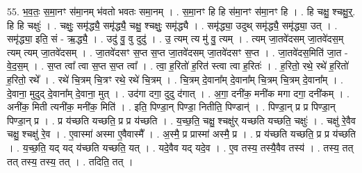 \documentclass[17pt]{extarticle}
\begin{document}
55. भ॒व॒तः॒ स॒मा॒नꣳ स॑मा॒नम् भ॑वतो भवतः समा॒नम् । . स॒मा॒नꣳ हि हि स॑मा॒नꣳ स॑मा॒नꣳ हि । . हि चक्षु॒ श्चक्षु॒र्॒. हि हि चक्षुः॑ । . चक्षुः॒ समृ॑द्ध्यै॒ समृ॑द्ध्यै॒ चक्षु॒ श्चक्षुः॒ समृ॑द्ध्यै । . समृ॑द्ध्या॒ उदुथ् समृ॑द्ध्यै॒ समृ॑द्ध्या॒ उत् । . समृ॑द्ध्या॒ इति॒ सं - ऋ॒द्ध्यै॒ । . उदु॑ वु॒ वु दुदु॑ । . उ॒ त्यम् त्य मु॑ वु॒ त्यम् । . त्यम् जा॒तवे॑दसम् जा॒तवे॑दस॒म् त्यम् त्यम् जा॒तवे॑दसम् । . जा॒तवे॑दसꣳ स॒प्त स॒प्त जा॒तवे॑दसम् जा॒तवे॑दसꣳ स॒प्त । . जा॒तवे॑दस॒मिति॑ जा॒त - वे॒द॒स॒म् । . स॒प्त त्वा᳚ त्वा स॒प्त स॒प्त त्वा᳚ । . त्वा॒ ह॒रितो॑ ह॒रित॑ स्त्वा त्वा ह॒रितः॑ । . ह॒रितो॒ रथे॒ रथे॑ ह॒रितो॑ ह॒रितो॒ रथे᳚ । . रथे॑ चि॒त्रम् चि॒त्रꣳ रथे॒ रथे॑ चि॒त्रम् । . चि॒त्रम् दे॒वाना᳚म् दे॒वाना᳚म् चि॒त्रम् चि॒त्रम् दे॒वाना᳚म् । . दे॒वाना॒ मुदुद् दे॒वाना᳚म् दे॒वाना॒ मुत् । . उद॑गा दगा॒ दुदु द॑गात् । . अ॒गा॒ दनी॑क॒ मनी॑क मगा दगा॒ दनी॑कम् । . अनी॑क॒ मिती त्यनी॑क॒ मनी॑क॒ मिति॑ । . इति॒ पिण्डा॒न् पिण्डा॒ नितीति॒ पिण्डान्॑ । . पिण्डा॒न् प्र प्र पिण्डा॒न् पिण्डा॒न् प्र । . प्र य॑च्छति यच्छति॒ प्र प्र य॑च्छति । . य॒च्छ॒ति॒ चक्षु॒ श्चक्षु॑र् यच्छति यच्छति॒ चक्षुः॑ । . चक्षु॑ रे॒वैव चक्षु॒ श्चक्षु॑ रे॒व । . ए॒वास्मा॑ अस्मा ए॒वैवास्मै᳚ । . अ॒स्मै॒ प्र प्रास्मा॑ अस्मै॒ प्र । . प्र य॑च्छति यच्छति॒ प्र प्र य॑च्छति । . य॒च्छ॒ति॒ यद् यद् य॑च्छति यच्छति॒ यत् । . यदे॒वैव यद् यदे॒व । . ए॒व तस्य॒ तस्यै॒वैव तस्य॑ । . तस्य॒ तत् तत् तस्य॒ तस्य॒ तत् । . तदिति॒ तत् । \newline
\end{document}
